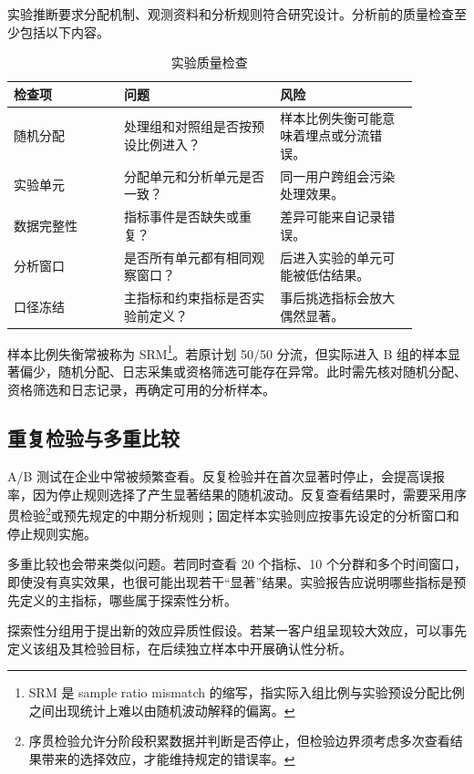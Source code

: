 实验推断要求分配机制、观测资料和分析规则符合研究设计。分析前的质量检查至少包括以下内容。

\begin{table}[htbp]
\centering
\caption{实验质量检查}
\begin{tabular}{P{0.24\linewidth}P{0.34\linewidth}P{0.30\linewidth}}
\toprule
{}
检查项 & 问题 & 风险\\
\midrule

随机分配 & 处理组和对照组是否按预设比例进入？ & 样本比例失衡可能意味着埋点或分流错误。\\
实验单元 & 分配单元和分析单元是否一致？ & 同一用户跨组会污染处理效果。\\
数据完整性 & 指标事件是否缺失或重复？ & 差异可能来自记录错误。\\
分析窗口 & 是否所有单元都有相同观察窗口？ & 后进入实验的单元可能被低估结果。\\
口径冻结 & 主指标和约束指标是否实验前定义？ & 事后挑选指标会放大偶然显著。\\
\bottomrule
\end{tabular}
\end{table}

样本比例失衡常被称为 SRM\footnote{SRM 是 sample ratio mismatch 的缩写，指实际入组比例与实验预设分配比例之间出现统计上难以由随机波动解释的偏离。}。若原计划 50/50 分流，但实际进入 B 组的样本显著偏少，随机分配、日志采集或资格筛选可能存在异常。此时需先核对随机分配、资格筛选和日志记录，再确定可用的分析样本。

\subsection{重复检验与多重比较}

A/B 测试在企业中常被频繁查看。反复检验并在首次显著时停止，会提高误报率，因为停止规则选择了产生显著结果的随机波动。反复查看结果时，需要采用序贯检验\footnote{序贯检验允许分阶段积累数据并判断是否停止，但检验边界须考虑多次查看结果带来的选择效应，才能维持规定的错误率。}或预先规定的中期分析规则；固定样本实验则应按事先设定的分析窗口和停止规则实施。

多重比较也会带来类似问题。若同时查看 20 个指标、10 个分群和多个时间窗口，即使没有真实效果，也很可能出现若干“显著”结果。实验报告应说明哪些指标是预先定义的主指标，哪些属于探索性分析。

\begin{remark}
探索性分组用于提出新的效应异质性假设。若某一客户组呈现较大效应，可以事先定义该组及其检验目标，在后续独立样本中开展确认性分析。
\end{remark}


